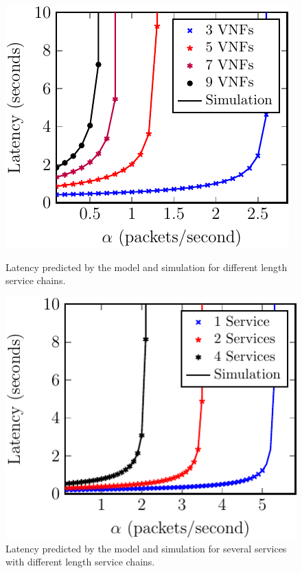 \begin{figure}
\vspace{2mm}

\begin{minipage}[b]{.49\textwidth}
	\includegraphics[width=\linewidth]{graphs/diff_lengths-crop}
	\caption{Latency predicted by the model and simulation for different length
service chains.}
	\label{fig:length_chain}
\end{minipage}
\hfill
\begin{minipage}[b]{.49\textwidth}
	\includegraphics[width=\linewidth]{graphs/mult_services-crop}
	\caption{Latency predicted by the model and simulation for several services
with different length service chains.}
	\label{fig:mult_services}
\end{minipage}

\end{figure}

